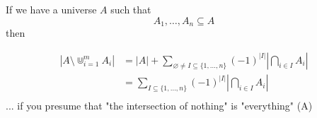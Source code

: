 If we have a universe $A$ such that
\[
    A_1,\ldots,A_n \subseteq A
\]then

\begin{align*}
|A\setminus \Cup_{i=1}^m A_i| &=
|A| +
    \sum_{\varnothing\neq I\subseteq\{1,\ldots,n\}}
        (-1)^{|I|}
        \left| \bigcap_{i\in I} A_i \right| \\
&=
\sum_{I\subseteq\{1,\ldots,n\}}
    (-1)^{|I|}
    \left| \bigcap_{i\in I} A_i \right| \\
\end{align*}
... if you presume that "the intersection of nothing" is "everything" (A)






























